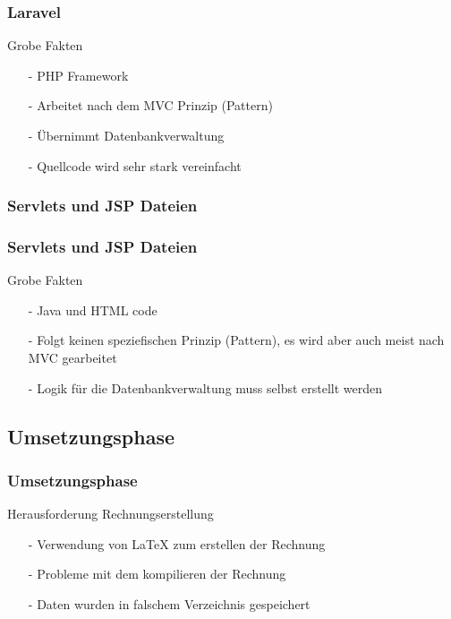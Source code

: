 \documentclass[12pt]{beamer}
\begin{document}
\begin{frame}
\frametitle{Laravel}

\begin{Large}
Grobe Fakten \vspace{0.2 cm}
\end{Large} 

\begin{itemize}
	\item[-] PHP Framework
	\item[-] Arbeitet nach dem MVC Prinzip (Pattern)
	\item[-] Übernimmt Datenbankverwaltung  
	\item[-] Quellcode wird sehr stark vereinfacht
\end{itemize}
	
\end{frame}


\subsubsection{Servlets und JSP Dateien}

\begin{frame}
	\frametitle{Servlets und JSP Dateien}
	
	\begin{Large}
		Grobe Fakten \vspace{0.2 cm}
	\end{Large}		
	\begin{itemize}
		\item[-] Java und HTML code
		\item[-] Folgt keinen speziefischen Prinzip (Pattern), es wird aber auch meist nach MVC gearbeitet
		\item[-] Logik für die Datenbankverwaltung muss selbst erstellt werden
		
	\end{itemize}
	
\end{frame}


\subsection{Umsetzungsphase}
\begin{frame}
\frametitle{Umsetzungsphase}

\begin{Large}
Herausforderung Rechnungserstellung \vspace{0.2 cm}
\end{Large}

\begin{itemize}
	\item[-] Verwendung von \LaTeX \hspace{0.05 cm} zum erstellen der Rechnung
	\item[-] Probleme mit dem kompilieren der Rechnung
	\item[-] Daten wurden in falschem Verzeichnis gespeichert
\end{itemize}

\end{frame}
\end{document}
